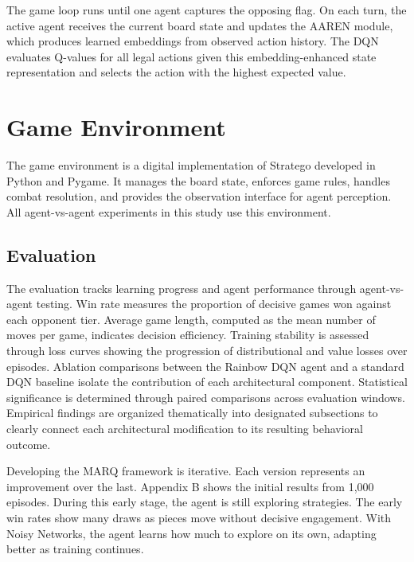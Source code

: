 The game loop runs until one agent captures the opposing flag. On each turn, the active agent receives the current board state and updates the AAREN module, which produces learned embeddings from observed action history. The DQN evaluates Q-values for all legal actions given this embedding-enhanced state representation and selects the action with the highest expected value.


\section{Game Environment}
The game environment is a digital implementation of Stratego developed in Python and Pygame. It manages the board state, enforces game rules, handles combat resolution, and provides the observation interface for agent perception. All agent-vs-agent experiments in this study use this environment.

\subsection{Evaluation}
The evaluation tracks learning progress and agent performance through agent-vs-agent testing. Win rate measures the proportion of decisive games won against each opponent tier. Average game length, computed as the mean number of moves per game, indicates decision efficiency. Training stability is assessed through loss curves showing the progression of distributional and value losses over episodes. Ablation comparisons between the Rainbow DQN agent and a standard DQN baseline isolate the contribution of each architectural component. Statistical significance is determined through paired comparisons across evaluation windows. Empirical findings are organized thematically into designated subsections to clearly connect each architectural modification to its resulting behavioral outcome.

Developing the MARQ framework is iterative. Each version represents an improvement over the last. Appendix B shows the initial results from 1,000 episodes. During this early stage, the agent is still exploring strategies. The early win rates show many draws as pieces move without decisive engagement. With Noisy Networks, the agent learns how much to explore on its own, adapting better as training continues.
